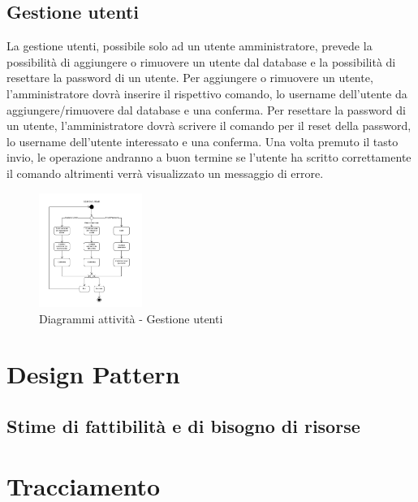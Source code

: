 \documentclass{scalatekids-article}
\begin{document}
\subsection{Gestione utenti}
La gestione utenti, possibile solo ad un utente amministratore, prevede la possibilità di aggiungere o rimuovere un utente dal database e la possibilità di resettare la password di un utente.
Per aggiungere o rimuovere un utente, l'amministratore dovrà inserire il rispettivo comando, lo username dell'utente da aggiungere/rimuovere dal database e una conferma.
Per resettare la password di un utente, l'amministratore dovrà scrivere il comando per il reset della password, lo username dell'utente interessato e una conferma.
Una volta premuto il tasto invio, le operazione andranno a buon termine se l'utente ha scritto correttamente il comando altrimenti verrà visualizzato un messaggio di errore.

\begin{figure}[H]
	\begin{center}
		\includegraphics[width=0.3\textwidth, keepaspectratio]{img/diagrammiAttivita/gestioneUtenti.jpeg}
		\caption*{Diagrammi attività - Gestione utenti}
	\end{center}
\end{figure}

\section{Design Pattern}

\subsection{Stime di fattibilità e di bisogno di risorse}

\section{Tracciamento}
\end{document}

